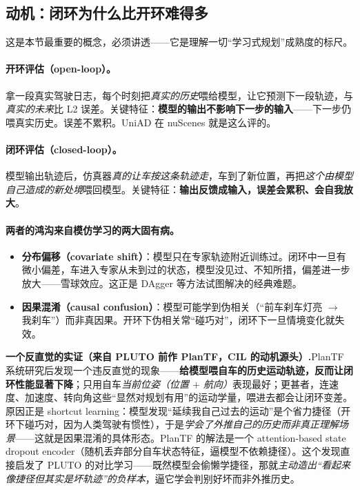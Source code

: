 \subsection{动机：闭环为什么比开环难得多}
\label{sec:de-closedloop}

这是本节最重要的概念，必须讲透——它是理解一切“学习式规划”成熟度的标尺。

\paragraph{开环评估（open-loop）。}
拿一段真实驾驶日志，每个时刻把\emph{真实的历史}喂给模型，让它预测下一段轨迹，与\emph{真实的未来}比 L2 误差。关键特征：\textbf{模型的输出不影响下一步的输入}——下一步仍喂真实历史。误差不累积。UniAD 在 nuScenes 就是这么评的。

\paragraph{闭环评估（closed-loop）。}
模型输出轨迹后，仿真器\emph{真的让车按这条轨迹走}，车到了新位置，再把\emph{这个由模型自己造成的新处境}喂回模型。关键特征：\textbf{输出反馈成输入，误差会累积、会自我放大}。

\paragraph{两者的鸿沟来自模仿学习的两大固有病。}
\begin{itemize}
  \item \textbf{分布偏移（covariate shift）}：模型只在专家轨迹附近训练过。闭环中一旦有微小偏差，车进入专家从未到过的状态，模型没见过、不知所措，偏差进一步放大——雪球效应。这正是 DAgger\cite{ross2011dagger} 等方法试图解决的经典难题。
  \item \textbf{因果混淆（causal confusion）}：模型可能学到伪相关（“前车刹车灯亮 $\to$ 我刹车”）而非真因果。开环下伪相关常“碰巧对”，闭环下一旦情境变化就失效。
\end{itemize}

\begin{note}
\textbf{一个反直觉的实证（来自 PLUTO 前作 PlanTF，CIL 的动机源头）.}\;PlanTF 系统研究后发现一个违反直觉的现象——\textbf{给模型喂自车的历史运动轨迹，反而让闭环性能显著下降}；只用自车\emph{当前位姿（位置 $+$ 航向）}表现最好；更甚者，连速度、加速度、转向角这些“显然对规划有用”的运动学量，喂进去都会让闭环变差。原因正是 shortcut learning：模型发现“延续我自己过去的运动”是个省力捷径（开环下碰巧对，因为人类驾驶有惯性），于是\emph{学会了外推自己的历史而非真正理解场景}——这就是因果混淆的具体形态。PlanTF 的解法是一个 attention-based state dropout encoder（随机丢弃部分自车状态特征，逼模型不依赖捷径）。这个发现直接启发了 PLUTO 的对比学习——既然模型会偷懒学捷径，那就\emph{主动造出“看起来像捷径但其实是坏轨迹”的负样本}，逼它学会判别好坏而非外推历史。
\end{note}

